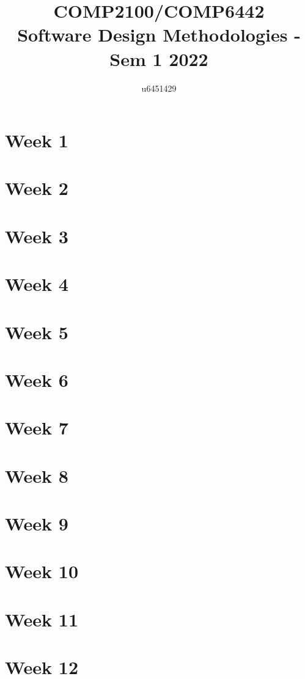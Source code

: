 \documentclass{article}
\title{COMP2100/COMP6442 \\ Software Design Methodologies - Sem 1 2022}
\author{u6451429}
\begin{document}
  
\maketitle
  
\tableofcontents

\pagebreak
\section{Week 1}

\pagebreak
\section{Week 2}

\pagebreak
\section{Week 3}

\pagebreak
\section{Week 4}

\pagebreak
\section{Week 5}

\pagebreak
\section{Week 6}

\pagebreak
\section{Week 7}

\pagebreak
\section{Week 8}

\pagebreak
\section{Week 9}

\pagebreak
\section{Week 10}

\pagebreak
\section{Week 11}

\pagebreak
\section{Week 12}
\end{document}

